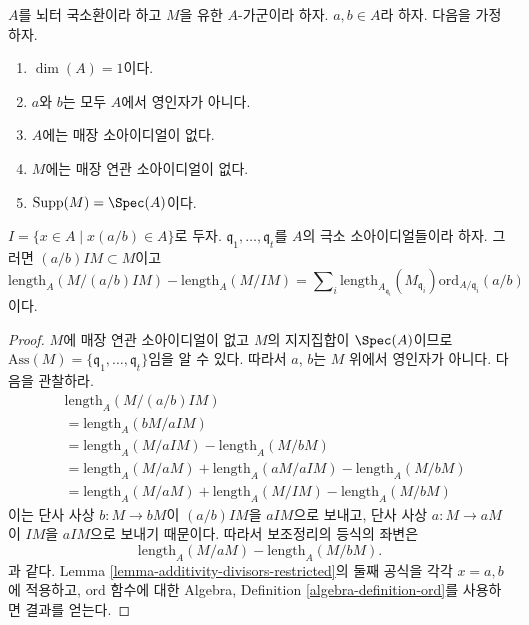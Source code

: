 \begin{lemma}
\label{lemma-no-embedded-points-modules}
$A$를 뇌터 국소환이라 하고 $M$을 유한 $A$-가군이라 하자.
$a, b \in A$라 하자. 다음을 가정하자.
\begin{enumerate}
\item $\dim(A) = 1$이다.
\item $a$와 $b$는 모두 $A$에서 영인자가 아니다.
\item $A$에는 매장 소아이디얼이 없다.
\item $M$에는 매장 연관 소아이디얼이 없다.
\item $\text{Supp}(M) = \Spec(A)$이다.
\end{enumerate}
$I = \{x \in A \mid x(a/b) \in A\}$로 두자.
$\mathfrak q_1, \ldots, \mathfrak q_t$를 $A$의 극소 소아이디얼들이라
하자. 그러면 $(a/b)IM \subset M$이고
$$
\text{length}_A(M/(a/b)IM)
-
\text{length}_A(M/IM)
=
\sum\nolimits_i
\text{length}_{A_{\mathfrak q_i}}(M_{\mathfrak q_i})
\text{ord}_{A/\mathfrak q_i}(a/b)
$$
이다.
\end{lemma}

\begin{proof}
$M$에 매장 연관 소아이디얼이 없고 $M$의 지지집합이 $\Spec(A)$이므로
$\text{Ass}(M) = \{\mathfrak q_1, \ldots, \mathfrak q_t\}$임을
알 수 있다. 따라서 $a$, $b$는 $M$ 위에서 영인자가 아니다.
다음을 관찰하라.
\begin{align*}
& \text{length}_A(M/(a/b)IM) \\
& = \text{length}_A(bM/aIM) \\
& = \text{length}_A(M/aIM)
-
\text{length}_A(M/bM) \\
& = \text{length}_A(M/aM) + \text{length}_A(aM/aIM) - \text{length}_A(M/bM) \\
& = \text{length}_A(M/aM) + \text{length}_A(M/IM) - \text{length}_A(M/bM)
\end{align*}
이는 단사 사상 $b : M \to bM$이 $(a/b)IM$을 $aIM$으로 보내고,
단사 사상 $a : M \to aM$이 $IM$을 $aIM$으로 보내기 때문이다.
따라서 보조정리의 등식의 좌변은
$$
\text{length}_A(M/aM) - \text{length}_A(M/bM).
$$
과 같다. Lemma \ref{lemma-additivity-divisors-restricted}의 둘째
공식을 각각 $x = a, b$에 적용하고, $\text{ord}$ 함수에 대한
Algebra, Definition \ref{algebra-definition-ord}를 사용하면 결과를
얻는다.
\end{proof}

